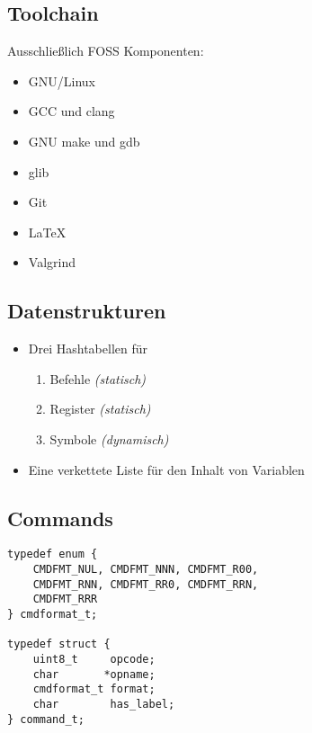 \subsection{Toolchain}

\begin{frame}{\insertsection}{\insertsubsection}
    Ausschließlich FOSS Komponenten:
    \begin{itemize}
        \item GNU/Linux
        \item GCC und clang
        \item GNU make und gdb
        \item glib
        \item Git
        \item \LaTeX{}
        \item Valgrind
    \end{itemize}
\end{frame}

\subsection{Datenstrukturen}

\begin{frame}{\insertsection}{\insertsubsection}
    \begin{itemize}
        \item Drei Hashtabellen für
        \begin{enumerate}
            \item Befehle \textit{(statisch)}
            \item Register \textit{(statisch)}
            \item Symbole \textit{(dynamisch)}
        \end{enumerate}
        \item Eine verkettete Liste für den Inhalt von Variablen
    \end{itemize}
\end{frame}

\subsection{Commands}

\begin{frame}[fragile]{\insertsubsection}
\begin{lstlisting}
typedef enum {
    CMDFMT_NUL, CMDFMT_NNN, CMDFMT_R00,
    CMDFMT_RNN, CMDFMT_RR0, CMDFMT_RRN,
    CMDFMT_RRR
} cmdformat_t;

typedef struct {
    uint8_t     opcode;
    char       *opname;
    cmdformat_t format;
    char        has_label;
} command_t;
\end{lstlisting}
\end{frame}

